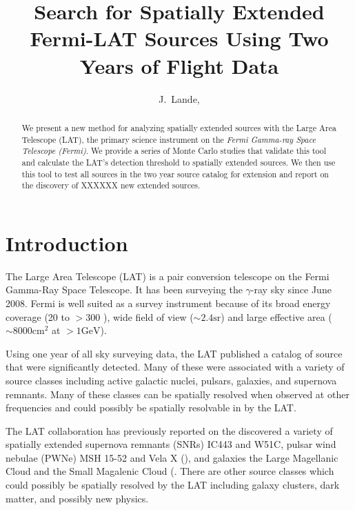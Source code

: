 \documentclass[12pt,preprint]{aastex}
\newcommand{\mev}{\text{MeV}\xspace}
\newcommand{\gev}{\text{GeV}\xspace}
\newcommand{\sr}{\text{sr}\xspace}
\newcommand{\cm}{\text{cm}\xspace}
\begin{document}
\title{Search for Spatially Extended Fermi-LAT Sources Using Two Years of Flight
Data}

\author{
J.~Lande, 
}


\begin{abstract}
We present a new method for analyzing spatially extended sources with
the Large Area Telescope (LAT), the primary science instrument
on the {\em Fermi Gamma-ray Space Telescope (Fermi)}.  We provide a
series of Monte Carlo studies that validate this tool
and calculate the LAT's detection threshold to spatially extended
sources.  We then use this tool to test all sources in the two
year source catalog for extension and report on the discovery
of XXXXXX new extended sources.
\end{abstract}

\section{Introduction}

The Large Area Telescope (LAT) is a pair conversion telescope on the
Fermi Gamma-Ray Space Telescope. It has been surveying the $\gamma$-ray
sky since June 2008.  Fermi is well suited as a survey
instrument because of its broad energy coverage (20 \mev
to $>300$ \gev), wide field of view ($\sim 2.4 \sr$) and large effective
area ($\sim 8000 \cm^2$ at $>1 \gev$).

Using one year of all sky surveying data, the LAT published a catalog of
source that were significantly detected.  Many of these were associated
with a variety of source classes including active galactic nuclei,
pulsars, galaxies, and supernova remnants.  Many of these classes can be
spatially resolved when observed at other frequencies and could possibly
be spatially resolvable in \gev by the LAT.

The LAT collaboration has previously reported on the discovered
a variety of spatially extended supernova remnants (SNRs)
IC443 and W51C, pulsar wind nebulae (PWNe) MSH 15-52 and Vela X
(\cite{ic443,w51c,msh1552,velax}), and galaxies the Large Magellanic
Cloud and the Small Magalenic Cloud (\cite{lmc,smc}.  There are other
source classes which could possibly be spatially resolved by the LAT
including galaxy clusters, dark matter, and possibly new physics.
\end{document}
